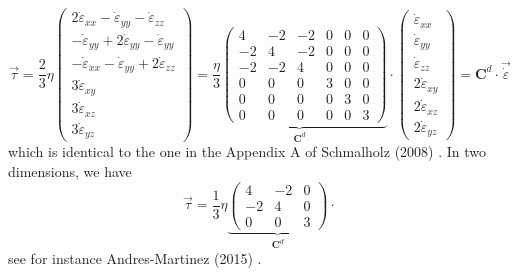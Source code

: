 \begin{equation}
\vec \tau  
= \frac{2}{3} \eta
\left(
\begin{array}{c}
2\dot\varepsilon_{xx} -\dot\varepsilon_{yy} -\dot\varepsilon_{zz} \\ 
-\dot\varepsilon_{yy} +2\dot\varepsilon_{yy} -\dot\varepsilon_{yy} \\ 
-\dot\varepsilon_{xx} -\dot\varepsilon_{yy} +2\dot\varepsilon_{zz} \\
3\dot\varepsilon_{xy} \\
3\dot\varepsilon_{xz} \\
3\dot\varepsilon_{yz} 
\end{array}
\right)
=
\underbrace{
\frac{\eta}{3}
\left(
\begin{array}{cccccc}
4 & -2& -2& 0& 0& 0\\
-2 & 4& -2& 0& 0& 0\\
-2 & -2& 4& 0& 0& 0\\
0 &0 &0 & 3& 0& 0\\
0 &0 &0 & 0& 3& 0\\
0 &0 &0 & 0& 0& 3 
\end{array}
\right)
}_{{\bm C}^d}
\cdot
\left(
\begin{array}{c}
\dot\varepsilon_{xx} \\
\dot\varepsilon_{yy} \\
\dot\varepsilon_{zz} \\
2\dot\varepsilon_{xy} \\
2\dot\varepsilon_{xz} \\
2\dot\varepsilon_{yz} 
\end{array}
\right)
=
{\bm C}^d \cdot \vec{\dot \varepsilon}
\label{eq:chap6:mixed:Cd}
\end{equation}
which is identical to the one in the Appendix A of Schmalholz (2008) \cite{schm08}.
In two dimensions, we have
\[
\vec\tau=\frac{1}{3}\eta 
\underbrace{
\left(
\begin{array}{ccc}
4 & -2 & 0 \\
-2 & 4 & 0 \\
0 &0 &  3 
\end{array}
\right)
}_{{\bm C}^d}
\cdot
\]
see for instance Andres-Martinez \etal (2015) \cite{anmp15}.

